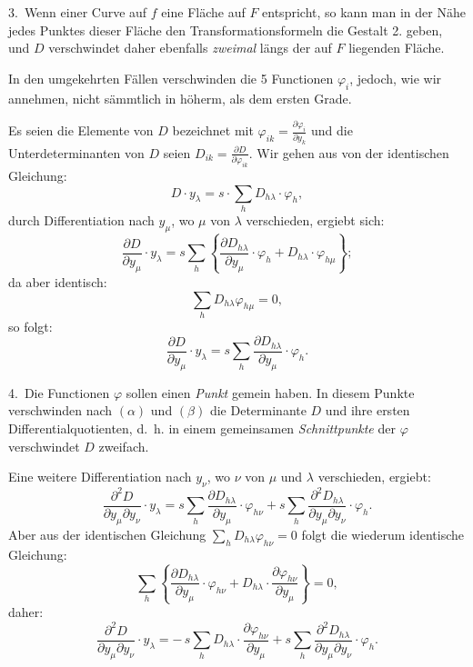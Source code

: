 \documentclass{article}
\begin{document}
3.~Wenn einer Curve auf $f$ eine Fläche auf $F$ entspricht, so kann man in der Nähe jedes Punktes dieser Fläche den Transformationsformeln die Gestalt 2. geben, und $D$ verschwindet daher ebenfalls \emph{zweimal} längs der auf $F$ liegenden Fläche.

In den umgekehrten Fällen verschwinden die 5 Functionen $\varphi_i$, jedoch, wie wir annehmen, nicht sämmtlich in höherm, als dem ersten Grade.

Es seien die Elemente von $D$ bezeichnet mit $\varphi_{ik} = \frac{\partial \varphi_i}{\partial y_k}$ und die Unterdeterminanten von $D$ seien $D_{ik} = \frac{\partial D}{\partial \varphi_{ik}}$. Wir gehen aus von der identischen Gleichung:
\[
D \cdot y_\lambda = s \cdot \sum_h D_{h\lambda} \cdot \varphi_h, \tag{$\alpha$}
\]
durch Differentiation nach $y_\mu$, wo $\mu$ von $\lambda$ verschieden, ergiebt sich:
\[
\frac{\partial D}{\partial y_\mu} \cdot y_\lambda = s \sum_h \left\{\frac{\partial D_{h\lambda}}{\partial y_\mu} \cdot \varphi_h + D_{h\lambda} \cdot \varphi_{h\mu}\right\};
\]
da aber identisch:
\[
\sum_h D_{h\lambda} \varphi_{h\mu} = 0,
\]
so folgt:
\[
\frac{\partial D}{\partial y_\mu} \cdot y_\lambda = s \sum_h \frac{\partial D_{h\lambda}}{\partial y_\mu} \cdot \varphi_h . \tag{$\beta$}
\]

4.~Die Functionen $\varphi$ sollen einen \emph{Punkt} gemein haben. In diesem Punkte verschwinden nach $(\alpha)$ und $(\beta)$ die Determinante $D$ und ihre ersten Differentialquotienten, d.~h. in einem gemeinsamen \emph{Schnittpunkte} der $\varphi$ verschwindet $D$ zweifach.

Eine weitere Differentiation nach $y_\nu$, wo $\nu$ von $\mu$ und $\lambda$ verschieden, ergiebt:
\[
\frac{\partial^2 D}{\partial y_\mu \partial y_\nu} \cdot y_\lambda = s \sum_h \frac{\partial D_{h\lambda}}{\partial y_\mu} \cdot \varphi_{h\nu} + s \sum_h \frac{\partial^2 D_{h\lambda}}{\partial y_\mu \partial y_\nu} \cdot \varphi_h . \tag{$\gamma$}
\]
Aber aus der identischen Gleichung $\displaystyle\sum_h D_{h\lambda} \varphi_{h\nu} = 0$ folgt die wiederum identische Gleichung:
\[
\sum_h \left\{\frac{\partial D_{h\lambda}}{\partial y_\mu} \cdot \varphi_{h\nu} + D_{h\lambda} \cdot \frac{\partial \varphi_{h\nu}}{\partial y_\mu}\right\} = 0, \tag{$\delta$}
\]
daher:
\[
\frac{\partial^2 D}{\partial y_\mu \partial y_\nu} \cdot y_\lambda = -\, s \sum_h D_{h\lambda} \cdot \frac{\partial \varphi_{h\nu}}{\partial y_\mu} + s \sum_h \frac{\partial^2 D_{h\lambda}}{\partial y_\mu \partial y_\nu} \cdot \varphi_h . \tag{$\gamma'$}
\]
\end{document}
